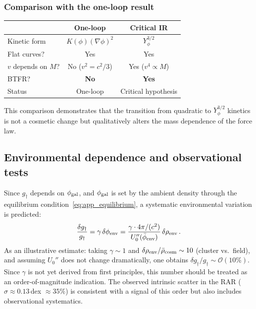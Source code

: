 \documentclass[11pt,a4paper]{article}
\numberwithin{equation}{section}
\begin{document}
\subsubsection{Comparison with the one-loop result}

\begin{center}
\begin{tabular}{lcc}
\hline
& \textbf{One-loop} & \textbf{Critical IR} \\
\hline
Kinetic form & $K(\phi)(\nabla\phi)^2$ & $Y_\phi^{3/2}$ \\
Flat curves? & Yes & Yes \\
$v$ depends on $M$? & No ($v^2 = c^2/3$) & Yes ($v^4 \propto M$) \\
BTFR? & \textbf{No} & \textbf{Yes} \\
Status & One-loop & Critical hypothesis \\
\hline
\end{tabular}
\end{center}

This comparison demonstrates that the transition from quadratic
to $Y_\phi^{3/2}$ kinetics is not a cosmetic change but
qualitatively alters the mass dependence of the force law.


\subsection{Environmental dependence and observational tests}
\label{app:lof:env}

Since $g_\dagger$ depends on $\phi_{\rm gal}$, and
$\phi_{\rm gal}$ is set by the ambient density through the
equilibrium condition~\eqref{eq:app_equilibrium}, a systematic
environmental variation is predicted:
\begin{equation}
\frac{\delta g_\dagger}{g_\dagger}
= \gamma\,\delta\phi_{\rm env}
= \frac{\gamma \cdot 4\pi/(c^2)}{U_0''(\bar\phi_{\rm env})}
  \,\delta\rho_{\rm env}\,.
\end{equation}
As an illustrative estimate: taking $\gamma \sim 1$ and
$\delta\rho_{\rm env}/\bar\rho_{\rm cosm} \sim 10$
(cluster vs.\ field), and assuming $U_0''$ does not change
dramatically, one obtains
$\delta g_\dagger/g_\dagger \sim \mathcal{O}(10\%)$.
Since $\gamma$ is not yet derived from first principles,
this number should be treated as an order-of-magnitude
indication.
The observed intrinsic scatter in the RAR
($\sigma \approx 0.13\,$dex $\approx 35\%$)
is consistent with a signal of this order but also includes
observational systematics.
\end{document}
